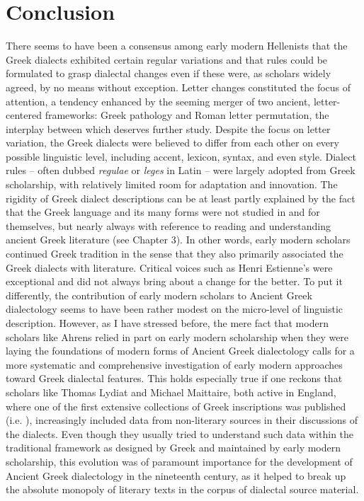 \section{Conclusion}\label{sec:6.5}

There seems to have been a consensus among early modern Hellenists that the Greek dialects exhibited certain regular variations and that rules could be formulated to grasp dialectal changes even if these were, as scholars widely agreed, by no means without exception. Letter changes constituted the focus of attention, a tendency enhanced by the seeming merger of two ancient, letter-centered frameworks: Greek pathology and Roman letter permutation, the interplay between which deserves further study. Despite the focus on letter variation, the Greek dialects were believed to differ from each other on every possible linguistic level, including accent, lexicon, syntax, and even style. Dialect rules – often dubbed \textit{regulae} or \textit{leges} in Latin – were largely adopted from Greek scholarship, with relatively limited room for adaptation and innovation. The rigidity of Greek dialect descriptions can be at least partly explained by the fact that the Greek language and its many forms were not studied in and for themselves, but nearly always with reference to reading and understanding ancient Greek literature (see Chapter 3). In other words, early modern scholars continued Greek tradition in the sense that they also primarily associated the Greek dialects with literature. Critical voices such as Henri Estienne’s were exceptional and did not always bring about a change for the better. To put it differently, the contribution of early modern scholars to Ancient Greek dialectology seems to have been rather modest on the micro-level of linguistic description. However, as I have stressed before, the mere fact that modern scholars like Ahrens relied in part on early modern scholarship when they were laying the foundations of modern forms of Ancient Greek dialectology calls for a more systematic and comprehensive investigation of early modern approaches toward Greek dialectal features. This holds especially true if one reckons that scholars like Thomas Lydiat and Michael Maittaire, both active in England, where one of the first extensive collections of Greek inscriptions was published (i.e. \citealt{Prideaux1676}), increasingly included data from non-literary sources in their discussions of the dialects. Even though they usually tried to understand such data within the traditional framework as designed by Greek and maintained by early modern scholarship, this evolution was of paramount importance for the development of Ancient Greek dialectology in the nineteenth century, as it helped to break up the absolute monopoly of literary texts in the corpus of dialectal source material.

